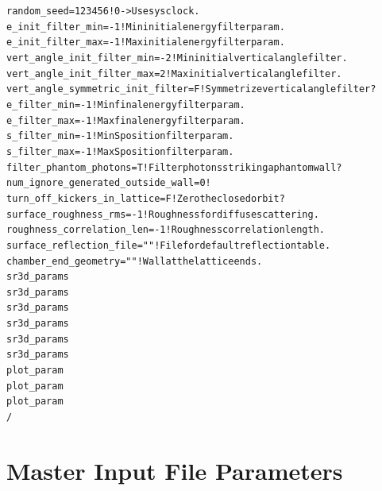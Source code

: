 \documentclass[11pt,openany]{report}
\newlength{\ExBeg}
\newlength{\ExEnd}
\newenvironment{example}
  {\vspace{\ExBeg} \begin{alltt}}
  {\end{alltt} \vspace{\ExEnd}}
\begin{document}
\begin{example}
    random_seed = 123456                 ! 0 -> Use sys clock.
    e_init_filter_min = -1               ! Min initial energy filter param.
    e_init_filter_max = -1               ! Max initial energy filter param.
    vert_angle_init_filter_min = -2      ! Min initial vertical angle filter.
    vert_angle_init_filter_max = 2       ! Max initial vertical angle filter.
    vert_angle_symmetric_init_filter = F ! Symmetrize vertical angle filter?
    e_filter_min = -1                    ! Min final energy filter param.
    e_filter_max = -1                    ! Max final energy filter param.
    s_filter_min = -1                    ! Min S position filter param.
    s_filter_max = -1                    ! Max S position filter param.
    filter_phantom_photons = T           ! Filter photons striking a phantom wall?
    num_ignore_generated_outside_wall = 0    !
    turn_off_kickers_in_lattice = F          ! Zero the closed orbit?
    surface_roughness_rms       = -1         ! Roughness for diffuse scattering.
    roughness_correlation_len   = -1         ! Roughness correlation length.
    surface_reflection_file     = ""         ! File for default reflection table.
    chamber_end_geometry = ""                   ! Wall at the lattice ends.
    sr3d_params%
    sr3d_params%
    sr3d_params%
    sr3d_params%
    sr3d_params%
    sr3d_params%
    plot_param%
    plot_param%
    plot_param%
  /
\end{example}

\section{Master Input File Parameters}
\label{s:master.params}
\end{document}
